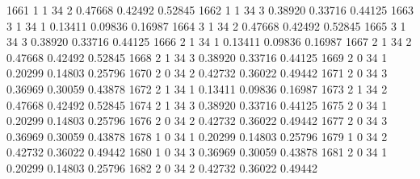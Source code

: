 \documentclass{article}
\begin{document}
\begin{Woutput}
1661      1       1      34       2       0.47668    0.42492    0.52845
1662      1       1      34       3       0.38920    0.33716    0.44125
1663      3       1      34       1       0.13411    0.09836    0.16987
1664      3       1      34       2       0.47668    0.42492    0.52845
1665      3       1      34       3       0.38920    0.33716    0.44125
1666      2       1      34       1       0.13411    0.09836    0.16987
1667      2       1      34       2       0.47668    0.42492    0.52845
1668      2       1      34       3       0.38920    0.33716    0.44125
1669      2       0      34       1       0.20299    0.14803    0.25796
1670      2       0      34       2       0.42732    0.36022    0.49442
1671      2       0      34       3       0.36969    0.30059    0.43878
1672      2       1      34       1       0.13411    0.09836    0.16987
1673      2       1      34       2       0.47668    0.42492    0.52845
1674      2       1      34       3       0.38920    0.33716    0.44125
1675      2       0      34       1       0.20299    0.14803    0.25796
1676      2       0      34       2       0.42732    0.36022    0.49442
1677      2       0      34       3       0.36969    0.30059    0.43878
1678      1       0      34       1       0.20299    0.14803    0.25796
1679      1       0      34       2       0.42732    0.36022    0.49442
1680      1       0      34       3       0.36969    0.30059    0.43878
1681      2       0      34       1       0.20299    0.14803    0.25796
1682      2       0      34       2       0.42732    0.36022    0.49442


\end{Woutput}
\end{document}

